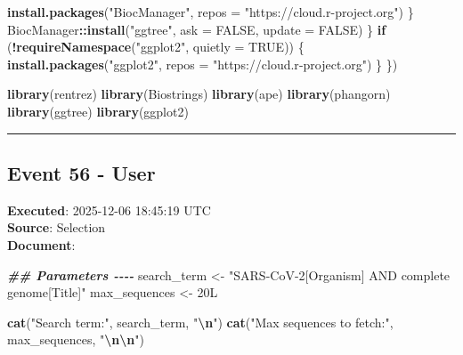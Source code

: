 \documentclass[
  11pt,
]{article}
\newenvironment{Shaded}{\begin{snugshade}}{\end{snugshade}}
\newcommand{\AttributeTok}[1]{\textcolor[rgb]{0.13,0.29,0.53}{#1}}
\newcommand{\ConstantTok}[1]{\textcolor[rgb]{0.56,0.35,0.01}{#1}}
\newcommand{\ControlFlowTok}[1]{\textcolor[rgb]{0.13,0.29,0.53}{\textbf{#1}}}
\newcommand{\DataTypeTok}[1]{\textcolor[rgb]{0.13,0.29,0.53}{#1}}
\newcommand{\DecValTok}[1]{\textcolor[rgb]{0.00,0.00,0.81}{#1}}
\newcommand{\DocumentationTok}[1]{\textcolor[rgb]{0.56,0.35,0.01}{\textbf{\textit{#1}}}}
\newcommand{\FunctionTok}[1]{\textcolor[rgb]{0.13,0.29,0.53}{\textbf{#1}}}
\newcommand{\NormalTok}[1]{#1}
\newcommand{\OtherTok}[1]{\textcolor[rgb]{0.56,0.35,0.01}{#1}}
\newcommand{\SpecialCharTok}[1]{\textcolor[rgb]{0.81,0.36,0.00}{\textbf{#1}}}
\newcommand{\StringTok}[1]{\textcolor[rgb]{0.31,0.60,0.02}{#1}}
\begin{document}
\begin{Shaded}
\begin{Highlighting}[]
      \FunctionTok{install.packages}\NormalTok{(}\StringTok{"BiocManager"}\NormalTok{, }\AttributeTok{repos =} \StringTok{"https://cloud.r{-}project.org"}\NormalTok{)}
\NormalTok{    \}}
\NormalTok{    BiocManager}\SpecialCharTok{::}\FunctionTok{install}\NormalTok{(}\StringTok{"ggtree"}\NormalTok{, }\AttributeTok{ask =} \ConstantTok{FALSE}\NormalTok{, }\AttributeTok{update =} \ConstantTok{FALSE}\NormalTok{)}
\NormalTok{  \}}
  \ControlFlowTok{if}\NormalTok{ (}\SpecialCharTok{!}\FunctionTok{requireNamespace}\NormalTok{(}\StringTok{"ggplot2"}\NormalTok{, }\AttributeTok{quietly =} \ConstantTok{TRUE}\NormalTok{)) \{}
    \FunctionTok{install.packages}\NormalTok{(}\StringTok{"ggplot2"}\NormalTok{, }\AttributeTok{repos =} \StringTok{"https://cloud.r{-}project.org"}\NormalTok{)}
\NormalTok{  \}}
\NormalTok{\})}

\FunctionTok{library}\NormalTok{(rentrez)}
\FunctionTok{library}\NormalTok{(Biostrings)}
\FunctionTok{library}\NormalTok{(ape)}
\FunctionTok{library}\NormalTok{(phangorn)}
\FunctionTok{library}\NormalTok{(ggtree)}
\FunctionTok{library}\NormalTok{(ggplot2)}
\end{Highlighting}
\end{Shaded}

\begin{center}\rule{0.5\linewidth}{0.5pt}\end{center}

\subsection{Event 56 - User}\label{event-56---user}

\textbf{Executed}: 2025-12-06 18:45:19 UTC\\
\textbf{Source}: Selection\\
\textbf{Document}:

\begin{Shaded}
\begin{Highlighting}[]
\DocumentationTok{\#\# Parameters {-}{-}{-}{-}}
\NormalTok{search\_term }\OtherTok{\textless{}{-}} \StringTok{"SARS{-}CoV{-}2[Organism] AND complete genome[Title]"}
\NormalTok{max\_sequences }\OtherTok{\textless{}{-}} \DecValTok{20}\DataTypeTok{L}

\FunctionTok{cat}\NormalTok{(}\StringTok{"Search term:"}\NormalTok{, search\_term, }\StringTok{"}\SpecialCharTok{\textbackslash{}n}\StringTok{"}\NormalTok{)}
\FunctionTok{cat}\NormalTok{(}\StringTok{"Max sequences to fetch:"}\NormalTok{, max\_sequences, }\StringTok{"}\SpecialCharTok{\textbackslash{}n\textbackslash{}n}\StringTok{"}\NormalTok{)}
\end{Highlighting}
\end{Shaded}
\end{document}
